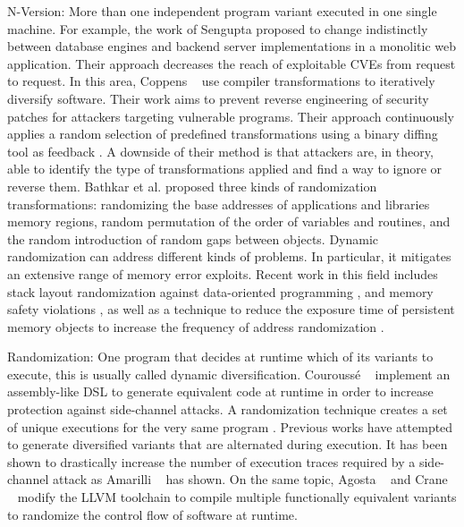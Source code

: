 \begin{usage}{N-Version:}
    \label{usage:n-version}
    \normalfont
    More than one independent program variant executed in one single machine. For example, the work of Sengupta \etal \cite{10.5555/3091125.3091155} proposed to change indistinctly between database engines and backend server implementations in a monolitic web application. Their approach decreases the reach of exploitable CVEs from request to request. 
    In this area, Coppens \etal~\cite{coppens2013feedback} use compiler transformations to iteratively diversify software. Their work aims to prevent reverse engineering of security patches for attackers targeting vulnerable programs.
    Their approach continuously applies a random selection of predefined transformations using a binary diffing tool as feedback \citationneeded. 
    A downside of their method is that attackers are, in theory, able to identify the type of transformations applied and find a way to ignore or reverse them.
    Bathkar et al. \cite{bhatkar03,bhatkar2005efficient} proposed three kinds of randomization transformations: randomizing the base addresses of applications and libraries  memory regions, random permutation of the order of variables and routines, and the random introduction of random gaps between objects. 
    Dynamic randomization can address different kinds of problems. In particular, it mitigates an extensive range of memory error exploits. 
    Recent work in this field includes stack layout randomization against data-oriented programming \cite{aga2019smokestack}, and memory safety violations \cite{lee2021savior}, as well as a technique to reduce the exposure time of persistent memory objects to increase the frequency of address randomization \cite{xu2020merr}.
\end{usage}


\begin{usage}{Randomization:}
    \label{usage:randomization}
    \normalfont
    One program that decides at runtime which of its variants to execute, this is usually called dynamic diversification. Courouss{\'e} \etal~\cite{courousse2016runtime} implement an assembly-like DSL to generate equivalent code at runtime in order to increase protection against side-channel attacks. 
    A randomization technique creates a set of unique executions for the very same program \cite{bhatkar03}. 
    Previous works have attempted to generate diversified variants that are alternated during execution.
    It has been shown to drastically increase the number of execution traces required by a side-channel attack as
    Amarilli \etal~\cite{amarilli2011can} has shown. On the same topic,
    Agosta \etal~\cite{agosta2015meet} and Crane \etal~\cite{crane2015thwarting}
    modify the LLVM toolchain to compile multiple functionally equivalent variants to randomize the control flow of software at runtime.
\end{usage}


